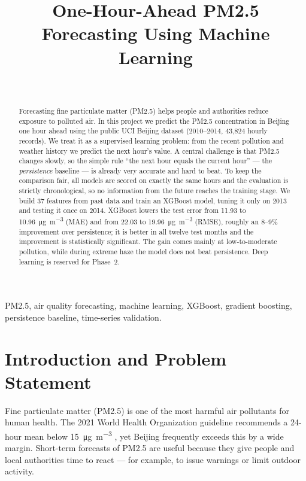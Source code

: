 \documentclass[onecolumn,11pt,journal]{IEEEtran}
\newcommand{\ugm}{\si{\micro\gram\per\cubic\metre}}
\begin{document}
\title{One-Hour-Ahead PM2.5 Forecasting Using Machine Learning}

\author{%
\\[3pt]
}

\maketitle

\begin{abstract}
Forecasting fine particulate matter (PM2.5) helps people and authorities reduce exposure to polluted air. In this project we predict the PM2.5 concentration in Beijing one hour ahead using the public UCI Beijing dataset (2010--2014, 43{,}824 hourly records). We treat it as a supervised learning problem: from the recent pollution and weather history we predict the next hour's value. A central challenge is that PM2.5 changes slowly, so the simple rule ``the next hour equals the current hour'' --- the \emph{persistence} baseline --- is already very accurate and hard to beat. To keep the comparison fair, all models are scored on exactly the same hours and the evaluation is strictly chronological, so no information from the future reaches the training stage. We build 37 features from past data and train an XGBoost model, tuning it only on 2013 and testing it once on 2014. XGBoost lowers the test error from 11.93 to 10.96~\ugm{} (MAE) and from 22.03 to 19.96~\ugm{} (RMSE), roughly an 8--9\% improvement over persistence; it is better in all twelve test months and the improvement is statistically significant. The gain comes mainly at low-to-moderate pollution, while during extreme haze the model does not beat persistence. Deep learning is reserved for Phase~2.
\end{abstract}

\begin{IEEEkeywords}
PM2.5, air quality forecasting, machine learning, XGBoost, gradient boosting, persistence baseline, time-series validation.
\end{IEEEkeywords}

\section{Introduction and Problem Statement}
Fine particulate matter (PM2.5) is one of the most harmful air pollutants for human health. The 2021 World Health Organization guideline recommends a 24-hour mean below 15~\ugm{} \cite{who2021aqg}, yet Beijing frequently exceeds this by a wide margin. Short-term forecasts of PM2.5 are useful because they give people and local authorities time to react --- for example, to issue warnings or limit outdoor activity.
\end{document}
